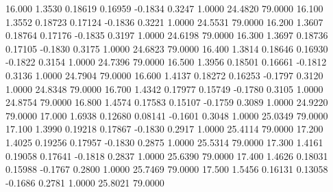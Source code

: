   16.000   1.3530   0.18619   0.16959  -0.1834   0.3247   1.0000  24.4820  79.0000
  16.100   1.3552   0.18723   0.17124  -0.1836   0.3221   1.0000  24.5531  79.0000
  16.200   1.3607   0.18764   0.17176  -0.1835   0.3197   1.0000  24.6198  79.0000
  16.300   1.3697   0.18736   0.17105  -0.1830   0.3175   1.0000  24.6823  79.0000
  16.400   1.3814   0.18646   0.16930  -0.1822   0.3154   1.0000  24.7396  79.0000
  16.500   1.3956   0.18501   0.16661  -0.1812   0.3136   1.0000  24.7904  79.0000
  16.600   1.4137   0.18272   0.16253  -0.1797   0.3120   1.0000  24.8348  79.0000
  16.700   1.4342   0.17977   0.15749  -0.1780   0.3105   1.0000  24.8754  79.0000
  16.800   1.4574   0.17583   0.15107  -0.1759   0.3089   1.0000  24.9220  79.0000
  17.000   1.6938   0.12680   0.08141  -0.1601   0.3048   1.0000  25.0349  79.0000
  17.100   1.3990   0.19218   0.17867  -0.1830   0.2917   1.0000  25.4114  79.0000
  17.200   1.4025   0.19256   0.17957  -0.1830   0.2875   1.0000  25.5314  79.0000
  17.300   1.4161   0.19058   0.17641  -0.1818   0.2837   1.0000  25.6390  79.0000
  17.400   1.4626   0.18031   0.15988  -0.1767   0.2800   1.0000  25.7469  79.0000
  17.500   1.5456   0.16131   0.13058  -0.1686   0.2781   1.0000  25.8021  79.0000
